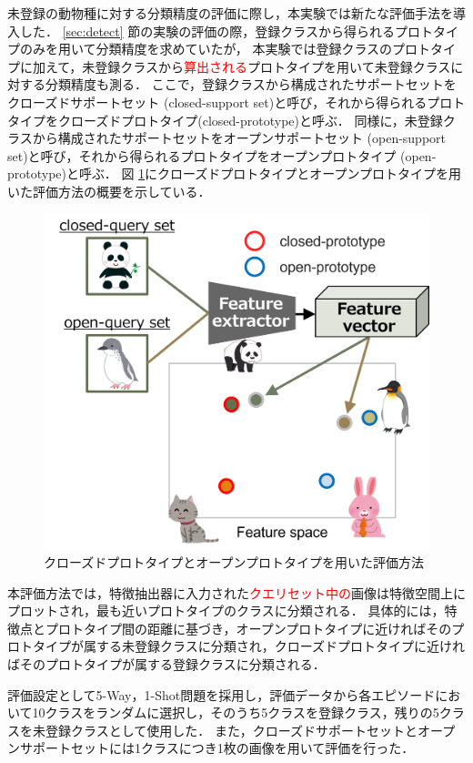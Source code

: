 \documentclass[a4paper,11pt,nomag]{jsreport}
\begin{document}
未登録の動物種に対する分類精度の評価に際し，本実験では新たな評価手法を導入した．
\ref{sec:detect} 節の実験の評価の際，登録クラスから得られるプロトタイプのみを用いて分類精度を求めていたが，
本実験では登録クラスのプロトタイプに加えて，未登録クラスから\textcolor{red}{算出される}プロトタイプを用いて未登録クラスに対する分類精度も測る．
ここで，登録クラスから構成されたサポートセットをクローズドサポートセット (closed-support set)と呼び，それから得られるプロトタイプをクローズドプロトタイプ(closed-prototype)と呼ぶ．
同様に，未登録クラスから構成されたサポートセットをオープンサポートセット (open-support set)と呼び，それから得られるプロトタイプをオープンプロトタイプ (open-prototype)と呼ぶ．
図 \ref{fig:openprototype}にクローズドプロトタイプとオープンプロトタイプを用いた評価方法の概要を示している．
% 
\begin{figure}[tbp]
  \centering
  \includegraphics[width=0.8\linewidth, keepaspectratio]{image/open-prototype.png}
  \caption{クローズドプロトタイプとオープンプロトタイプを用いた評価方法}
  \label{fig:openprototype}
\end{figure}
% 
本評価方法では，特徴抽出器に入力された\textcolor{red}{クエリセット中の}画像は特徴空間上にプロットされ，最も近いプロトタイプのクラスに分類される．
具体的には，特徴点とプロトタイプ間の距離に基づき，オープンプロトタイプに近ければそのプロトタイプが属する未登録クラスに分類され，クローズドプロトタイプに近ければそのプロトタイプが属する登録クラスに分類される．

評価設定として5-Way，1-Shot問題を採用し，評価データから各エピソードにおいて10クラスをランダムに選択し，そのうち5クラスを登録クラス，残りの5クラスを未登録クラスとして使用した．
また，クローズドサポートセットとオープンサポートセットには1クラスにつき1枚の画像を用いて評価を行った．
\end{document}
